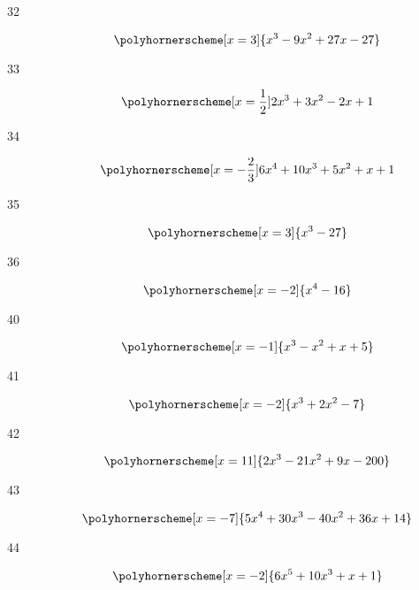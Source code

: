 \documentclass{exam}
\begin{document}
\begin{description}
      \item[32] 
        \[
          \polyhornerscheme[x = 3]{x^3 - 9x^2 + 27x - 27}
        \]


      \item[33] 
        \[
          \polyhornerscheme[x = \frac{1}{2}]{2x^3 + 3x^2 - 2x + 1}
        \]


      \item[34] 
        \[
          \polyhornerscheme[x = -\frac{2}{3}]{6x^4 + 10x^3 + 5x^2 + x + 1}
        \]


      \pagebreak

      \item[35] 
        \[
          \polyhornerscheme[x = 3]{x^3 - 27}
        \]


      \item[36] 
        \[
          \polyhornerscheme[x = -2]{x^4 - 16}
        \]


      \item[40] 
        \[
          \polyhornerscheme[x = -1]{x^3 - x^2 + x + 5}
        \]


      \item[41] 
        \[
          \polyhornerscheme[x = -2]{x^3 + 2x^2 - 7}
        \]


      \item[42]
        \[
          \polyhornerscheme[x = 11]{2x^3 - 21x^2 + 9x - 200}
        \]


      \item[43]
        \[
          \polyhornerscheme[x = -7]{5x^4 + 30x^3 - 40x^2 + 36x + 14}
        \]


      \item[44]
        \[
          \polyhornerscheme[x = -2]{6x^5 + 10x^3 + x + 1}
        \]



\end{description}
\end{document}
